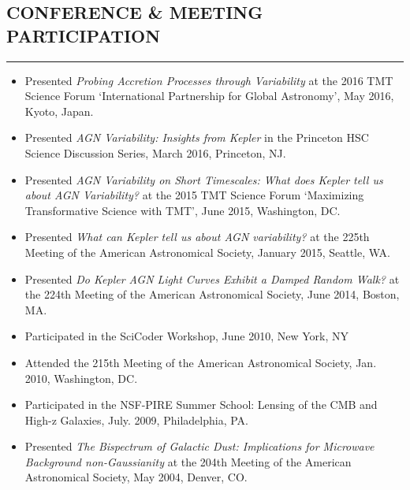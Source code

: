 \documentclass[10pt,a4]{article}
\newcounter{mySaveCounter}
\newcommand\myEnumReset{\setcounter{mySaveCounter}{0}}
\begin{document}
\myEnumReset 

\subsection*{CONFERENCE \& MEETING PARTICIPATION}
\hrule  height 4pt
\vspace{0.2cm}

\begin{itemize}

    \item Presented {\it Probing Accretion Processes through Variability} at the 2016 TMT Science Forum `International Partnership for Global Astronomy', May 2016, Kyoto, Japan.

    \item Presented {\it AGN Variability: Insights from Kepler} in the Princeton HSC Science Discussion Series, March 2016, Princeton, NJ.

    \item Presented {\it AGN Variability on Short Timescales: What does Kepler tell us about AGN Variability?} at the 2015 TMT Science Forum `Maximizing Transformative Science with TMT', June 2015, Washington, DC.

    \item Presented {\it What can Kepler tell us about AGN variability?} at the 225th Meeting of the American Astronomical Society, January 2015, Seattle, WA.

    \item Presented {\it Do Kepler AGN Light Curves Exhibit a Damped Random Walk?} at the 224th Meeting of the American Astronomical Society, June 2014, Boston, MA.
    
    \item Participated in the SciCoder Workshop, June 2010, New York, NY
    
    \item Attended the 215th Meeting of the American Astronomical Society, Jan. 2010, Washington, DC.
    
    \item Participated in the NSF-PIRE Summer School: Lensing of the CMB and High-z Galaxies, July. 2009, Philadelphia, PA.
    
    \item  Presented {\it The Bispectrum of Galactic Dust: Implications for Microwave Background non-Gaussianity} at the 204th Meeting of the American Astronomical Society, May 2004, Denver, CO.

\end{itemize}
\end{document}

